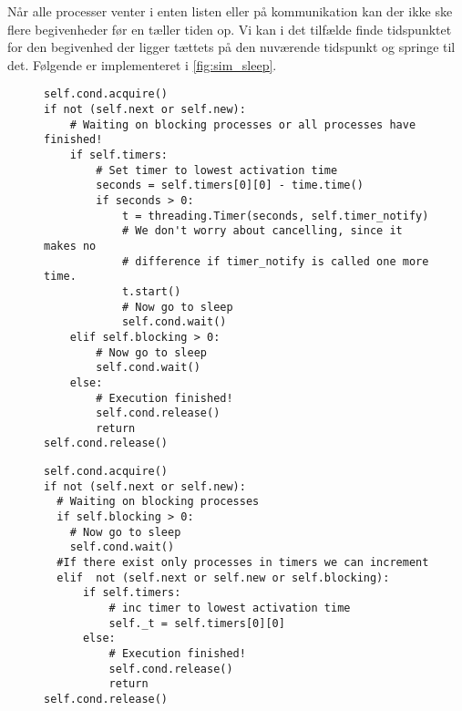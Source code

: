 Når alle processer venter i enten  listen eller på kommunikation kan der ikke ske flere begivenheder før \sched en tæller tiden op. 
Vi kan i det tilfælde finde tidspunktet for den begivenhed der ligger tættets på den nuværende tidspunkt  og springe til det. Følgende er implementeret i \cref{fig:sim_sleep}.
\begin{figure}[hbtp]
\begin{minipage}[c]{\linewidth}
\begin{lstlisting}[firstnumber=239, label=fig:blocking_sleep, caption=Uddrag af \sched en i \code{Scheduler}]
self.cond.acquire()
if not (self.next or self.new):
    # Waiting on blocking processes or all processes have finished!
    if self.timers:
        # Set timer to lowest activation time
        seconds = self.timers[0][0] - time.time()
        if seconds > 0:
            t = threading.Timer(seconds, self.timer_notify)
            # We don't worry about cancelling, since it makes no 
            # difference if timer_notify is called one more time.
            t.start()
            # Now go to sleep
            self.cond.wait()
    elif self.blocking > 0:
        # Now go to sleep
        self.cond.wait()
    else:
        # Execution finished!
        self.cond.release()
        return
self.cond.release()
\end{lstlisting}
\end{minipage}
\begin{minipage}[c]{\linewidth}
\begin{lstlisting}[firstnumber=158, label=fig:sim_sleep, caption= uddrag af \sched en i \code{Simulation}]
self.cond.acquire()
if not (self.next or self.new):
  # Waiting on blocking processes
  if self.blocking > 0:
    # Now go to sleep
    self.cond.wait()
  #If there exist only processes in timers we can increment
  elif  not (self.next or self.new or self.blocking): 
      if self.timers:
          # inc timer to lowest activation time
          self._t = self.timers[0][0]
      else:
          # Execution finished!
          self.cond.release()
          return
self.cond.release()  
\end{lstlisting}
\end{minipage}
\end{figure}

